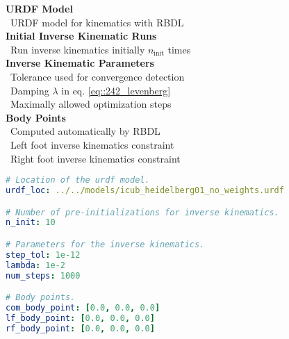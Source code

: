 \begin{minipage}[t]{1.\textwidth}
	\hspace*{-1cm}
	\begin{minipage}{0.4\textwidth}
		\scriptsize{
			\hfill \textbf{URDF Model}\\
			\mbox{}~\hfill URDF model for kinematics with RBDL\\
			
			\hfill \textbf{Initial Inverse Kinematic Runs}\\
			\mbox{}~\hfill Run inverse kinematics initially $n_\text{init}$ times\\
			
			\hfill \textbf{Inverse Kinematic Parameters}\\
			\mbox{}~\hfill Tolerance used for convergence detection\\
			\mbox{}~\hfill Damping $\lambda$ in eq. \ref{eq::242_levenberg}\\
			\mbox{}~\hfill Maximally allowed optimization steps\\
			
			\hfill \textbf{Body Points}\\
			\mbox{}~\hfill Computed automatically by RBDL\\
			\mbox{}~\hfill Left foot inverse kinematics constraint\\
			\mbox{}~\hfill Right foot inverse kinematics constraint}
	\end{minipage}
	\begin{minipage}{0.6\textwidth}
		\begin{lstlisting}[language=yaml]
# Location of the urdf model.
urdf_loc: ../../models/icub_heidelberg01_no_weights.urdf

# Number of pre-initializations for inverse kinematics.
n_init: 10

# Parameters for the inverse kinematics.
step_tol: 1e-12
lambda: 1e-2
num_steps: 1000

# Body points.
com_body_point: [0.0, 0.0, 0.0]
lf_body_point: [0.0, 0.0, 0.0]
rf_body_point: [0.0, 0.0, 0.0]
		\end{lstlisting}
	\end{minipage}
	\label{sec::63_ki_conf}
\end{minipage}






